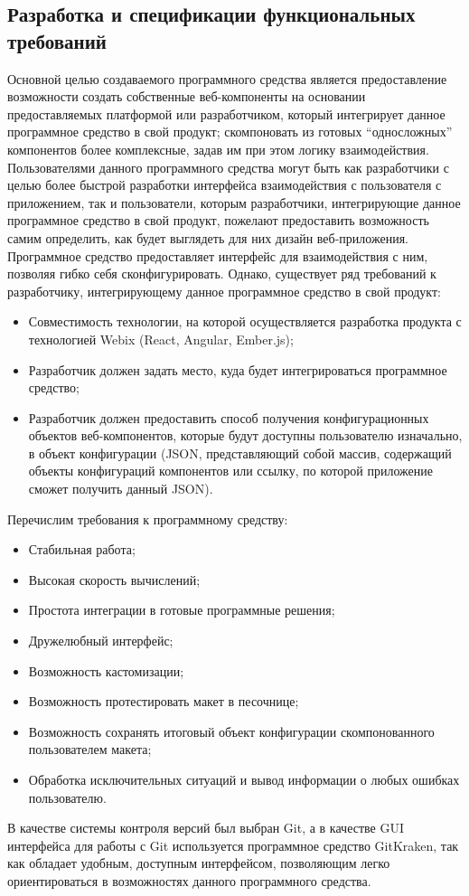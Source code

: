 \subsection{Разработка и спецификации функциональных требований}
\label{sec:analysis:specification}

Основной целью создаваемого программного средства является предоставление возможности создать собственные веб-компоненты на основании предоставляемых платформой или разработчиком, который интегрирует данное программное средство в свой продукт; скомпоновать из готовых “односложных” компонентов более комплексные, задав им при этом логику взаимодействия. 
Пользователями данного программного средства могут быть как разработчики с целью более быстрой разработки интерфейса взаимодействия с пользователя с приложением, так и пользователи, которым разработчики, интегрирующие данное программное средство в свой продукт, пожелают предоставить возможность самим определить, как будет выглядеть для них дизайн веб-приложения.
Программное средство предоставляет интерфейс для взаимодействия с ним, позволяя гибко себя сконфигурировать. Однако, существует ряд требований к разработчику, интегрирующему данное программное средство в свой продукт:

\begin{itemize}
    \item Совместимость технологии, на которой осуществляется разработка продукта с технологией Webix (React, Angular, Ember.js);
    \item Разработчик должен задать место, куда будет интегрироваться программное средство;
    \item Разработчик должен предоставить способ получения конфигурационных объектов веб-компонентов, которые будут доступны пользователю изначально, в объект конфигурации (JSON, представляющий собой массив, содержащий объекты конфигураций компонентов или ссылку, по которой приложение сможет получить данный JSON).
\end{itemize}

Перечислим требования к программному средству:

\begin{itemize}
    \item Стабильная работа;
    \item Высокая скорость вычислений;
    \item Простота интеграции в готовые программные решения;
    \item Дружелюбный интерфейс;
    \item Возможность кастомизации;
    \item Возможность протестировать макет в песочнице;
    \item Возможность сохранять итоговый объект конфигурации скомпонованного пользователем макета;
    \item Обработка исключительных ситуаций и вывод информации о любых ошибках пользователю.
\end{itemize}

В качестве системы контроля версий был выбран Git, а в качестве GUI интерфейса для работы с Git используется программное средство GitKraken, так как обладает удобным, доступным интерфейсом, позволяющим легко ориентироваться в возможностях данного программного средства.
